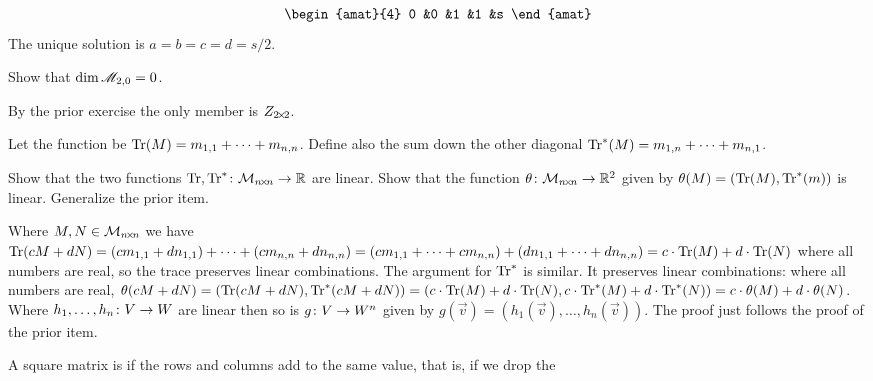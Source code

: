\begin{exercises}
\begin{answer}
\begin{multline*}
\begin{amat}{4}
          0  &0  &1  &1  &s  
        \end{amat}
      \end{multline*}
      The unique solution is $a=b=c=d=s/2$.
    \end{answer}
  \item \label{exer:DimTwoMagicSqsMagicSumZero} 
    Show that $\dim\mathscr{M}_{2,0}=0$.
    \begin{answer}
       By the prior exercise the only member is $Z_{2 \! \times \! 2}$.
    \end{answer}
  \item   \label{exer:TraceIsLinear}
    Let the  function be 
    $\operatorname{Tr} (M)=m_{1,1}+\cdots+m_{n,n}$.
    Define also
    the sum down the other diagonal
    $\operatorname{Tr}^* (M)=m_{1,n}+\cdots+m_{n,1}$.
    \begin{exparts}
      \partsitem 
        Show that the two functions 
        $\mbox{$\operatorname{Tr},\operatorname{Tr}^*\colon \mathcal{M}_{n \! \times \! n}\to \mathbb{R}$}$
        are linear.
      \partsitem
        Show that the function
       $\mbox{$\theta\colon \mathcal{M}_{n \! \times \! n}\to \mathbb{R}^2$}$
       given by $\theta(M)=(\operatorname{Tr}(M),\operatorname{Tr}^*(m))$
       is linear.
     \partsitem
       Generalize the prior item. 
    \end{exparts}
    \begin{answer}
      \begin{exparts}
        \partsitem
          Where $M,N\in\mathcal{M}_{n \! \times \! n}$ we have 
          $\operatorname{Tr}(cM+dN)=(cm_{1,1}+dn_{1,1})+\cdots+(cm_{n,n}+dn_{n,n})
          =(cm_{1,1}+\cdots+cm_{n,n})+(dn_{1,1}+\cdots+dn_{n,n})
          =c\cdot\operatorname{Tr}(M)+d\cdot\operatorname{Tr}(N)$ where
          all numbers are real, so the trace preserves linear
         combinations.
         The argument for $\operatorname{Tr}^*$ is similar.
       \partsitem
         It preserves linear combinations: where all numbers are real,
          $\theta(cM+dN)=(\operatorname{Tr}(cM+dN),\operatorname{Tr}^*(cM+dN))
          =(c\cdot\operatorname{Tr}(M)+d\cdot\operatorname{Tr}(N), c\cdot\operatorname{Tr}^*(M)+d\cdot\operatorname{Tr}^*(N))
          =c\cdot\theta(M)+d\cdot\theta(N)$.
       \partsitem   
         Where $\mbox{$h_1,\ldots,h_n\colon V\to W$}$ are linear then so is
         $\mbox{$g\colon V\to W^n$}$ given by
         $g(\vec{v})=(h_1(\vec{v}), \ldots, h_n(\vec{v}))$.
         The proof just follows the proof of the prior item.
      \end{exparts}
    \end{answer}
  \item A square matrix is  if 
     the rows and columns add to the same value, that is, if we drop the

\end{exercises}

